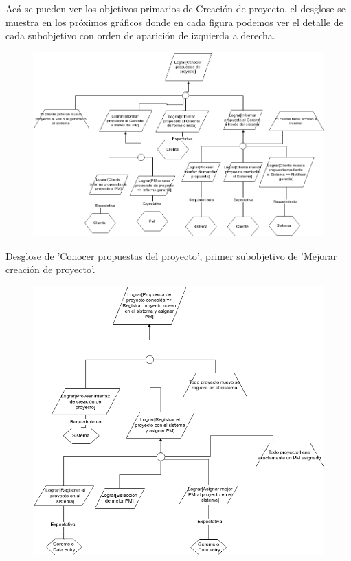 Acá se pueden ver los objetivos primarios de Creación de proyecto, el desglose se muestra en los próximos gráficos donde en cada figura podemos ver el detalle de cada subobjetivo con orden de aparición de izquierda a derecha.

\vspace{1em}

\begin{figure}[H]
    \centering
    \includegraphics[width=\textwidth]{imagenes/objetivos-creacion-1.png}
\end{figure}

Desglose de 'Conocer propuestas del proyecto', primer subobjetivo de 'Mejorar creación de proyecto'.

\vspace{1em}

\begin{figure}[H]
    \centering
    \includegraphics[width=\textwidth]{imagenes/objetivos-creacion-2.png}
\end{figure}

